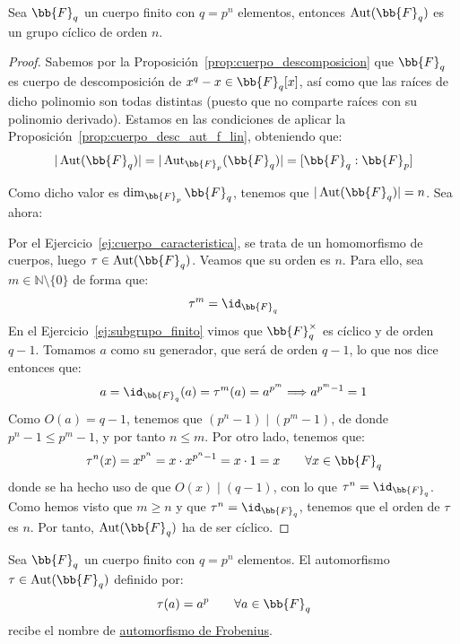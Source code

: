 \begin{teo}
    Sea $\bb{F}_q$ un cuerpo finito con $q=p^n$ elementos, entonces $\Aut(\bb{F}_q)$ es un grupo cíclico de orden $n$.
    \begin{proof}
        Sabemos por la Proposición~\ref{prop:cuerpo_descomposicion} que $\bb{F}_q$ es cuerpo de descomposición de $x^q-x\in \bb{F}_q[x]$, así como que las raíces de dicho polinomio son todas distintas (puesto que no comparte raíces con su polinomio derivado). Estamos en las condiciones de aplicar la Proposición~\ref{prop:cuerpo_desc_aut_f_lin}, obteniendo que:
        \begin{equation*}
            |\Aut(\bb{F}_q)| = |\Aut_{\bb{F}_p}(\bb{F}_q)| = [\bb{F}_q : \bb{F}_p]
        \end{equation*}

        Como dicho valor es $\dim_{\bb{F}_p}\bb{F}_q$, tenemos que $|\Aut(\bb{F}_q)| = n$. Sea ahora:
        
        Por el Ejercicio~\ref{ej:cuerpo_caracteristica}, se trata de un homomorfismo de cuerpos, luego $\tau \in \Aut(\bb{F}_q)$. Veamos que su orden es $n$. Para ello, sea $m\in \mathbb{N}\setminus \{0\}$ de forma que:
        \begin{equation*}
            \tau^m = \id_{\bb{F}_q}
        \end{equation*}
        En el Ejercicio~\ref{ej:subgrupo_finito} vimos que $\bb{F}_q^{\times}$ es cíclico y de orden $q-1$. Tomamos $a$ como su generador, que será de orden $q-1$, lo que nos dice entonces que:
        \begin{equation*}
            a = \id_{\bb{F}_q}(a) = \tau^m (a)  = a^{p^m}\Longrightarrow a^{p^m-1} = 1
        \end{equation*}
        Como $O(a)=q-1$, tenemos que $(p^n-1)\mid (p^m-1)$, de donde $p^n-1\leq p^m-1$, y por tanto $n\leq m$. Por otro lado, tenemos que:
        \begin{equation*}
            \tau^n(x) = x^{p^n} = x\cdot x^{p^n-1} = x\cdot 1 = x \qquad \forall x\in \bb{F}_q
        \end{equation*}
        donde se ha hecho uso de que $O(x)\mid (q-1)$, con lo que $\tau^n = \id_{\bb{F}_q}$. Como hemos visto que $m\geq n$ y que $\tau^n = \id_{\bb{F}_q}$, tenemos que el orden de $\tau$ es $n$. Por tanto, $\Aut(\bb{F}_q)$ ha de ser cíclico.
    \end{proof}
\end{teo}

\begin{definicion}\label{def:automorfismo_frobenius}
    Sea $\bb{F}_q$ un cuerpo finito con $q=p^n$ elementos. El automorfismo $\tau\in \Aut(\bb{F}_q)$ definido por:
    \begin{equation*}
        \tau(a) = a^p \qquad \forall a\in \bb{F}_q
    \end{equation*}
    recibe el nombre de \underline{automorfismo de Frobenius}.
\end{definicion}


